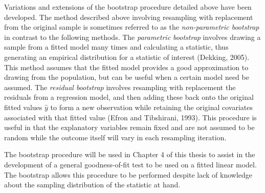 		Variations and extensions of the bootstrap procedure detailed above have been developed. The method described above involving resampling with replacement from the original sample is sometimes
		referred to as the \textit{non-parametric bootstrap} in contrast to the following methods. The \textit{parametric bootstrap} involves drawing a sample from a fitted model many times and calculating
		a statistic, thus generating an empirical distribution for a statistic of interest (Dekking, 2005). This method assumes that the fitted model provides a good approximation to drawing from the
		population, but can be useful when a certain model need be assumed. The \textit{residual bootstrap} involves resampling with replacement the residuals from a regression model, and then adding
		these back onto the original fitted values $\hat{y}$ to form a new observation while retaining the original covariates associated with that fitted value (Efron and Tibshirani, 1993). This procedure
		is useful in that the explanatory variables remain fixed and are not assumed to be random while the outcome itself will vary in each resampling iteration.

		The bootstrap procedure will be used in Chapter 4 of this thesis to assist in the development of a general goodness-of-fit test to be used on a fitted linear model. The bootstrap allows this procedure
		to be performed despite lack of knowledge about the sampling distribution of the statistic at hand.



		